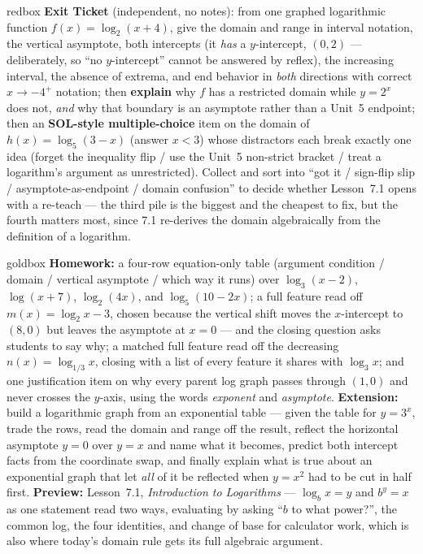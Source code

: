 \documentclass[10pt]{article}
\begin{document}
\begin{skillbox}{redbox}
\textbf{Exit Ticket} (independent, no notes): from one graphed logarithmic function
$f(x)=\log_2(x+4)$, give the domain and range in interval notation, the vertical asymptote, both
intercepts (it \emph{has} a $y$-intercept, $(0,2)$ --- deliberately, so ``no $y$-intercept'' cannot be
answered by reflex), the increasing interval, the absence of extrema, and end behavior in \emph{both}
directions with correct $x\to-4^{+}$ notation; then \textbf{explain} why $f$ has a restricted domain
while $y=2^x$ does not, \emph{and} why that boundary is an asymptote rather than a Unit~5 endpoint;
then an \textbf{SOL-style multiple-choice} item on the domain of $h(x)=\log_5(3-x)$ (answer $x<3$)
whose distractors each break exactly one idea (forget the inequality flip / use the Unit~5 non-strict
bracket / treat a logarithm's argument as unrestricted). Collect and sort into ``got it /
sign-flip slip / asymptote-as-endpoint / domain confusion'' to decide whether Lesson~7.1 opens with a
re-teach --- the third pile is the biggest and the cheapest to fix, but the fourth matters most,
since 7.1 re-derives the domain algebraically from the definition of a logarithm.
\end{skillbox}

\begin{skillbox}{goldbox}
\textbf{Homework:} a four-row equation-only table (argument condition / domain / vertical asymptote /
which way it runs) over $\log_3(x-2)$, $\log(x+7)$, $\log_2(4x)$, and $\log_5(10-2x)$; a full feature
read off $m(x)=\log_2 x-3$, chosen because the vertical shift moves the $x$-intercept to $(8,0)$ but
leaves the asymptote at $x=0$ --- and the closing question asks students to say why; a matched full
feature read off the decreasing $n(x)=\log_{1/3}x$, closing with a list of every feature it shares
with $\log_3 x$; and one justification item on why every parent log graph passes through $(1,0)$ and
never crosses the $y$-axis, using the words \emph{exponent} and \emph{asymptote}.
\textbf{Extension:} build a logarithmic graph from an exponential table --- given the table for
$y=3^x$, trade the rows, read the domain and range off the result, reflect the horizontal asymptote
$y=0$ over $y=x$ and name what it becomes, predict both intercept facts from the coordinate swap, and
finally explain what is true about an exponential graph that let \emph{all} of it be reflected when
$y=x^2$ had to be cut in half first. \textbf{Preview:} Lesson~7.1, \emph{Introduction to Logarithms}
--- $\log_b x=y$ and $b^y=x$ as one statement read two ways, evaluating by asking ``$b$ to what
power?'', the common log, the four identities, and change of base for calculator work, which is also
where today's domain rule gets its full algebraic argument.
\end{skillbox}
\end{document}
